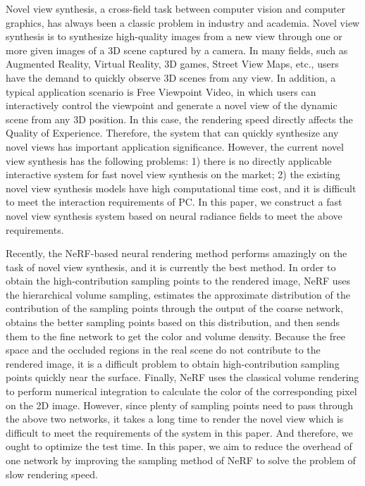 \begin{abstract*}
Novel view synthesis, a cross-field task between computer vision and computer graphics, has always been a classic problem in  industry and academia. Novel view synthesis is to synthesize high-quality images from a new view through one or more given images of a 3D scene captured by a camera. In many fields, such as Augmented Reality, Virtual Reality, 3D games, Street View Maps, etc., users have the demand to quickly observe 3D scenes from any view. In addition, a typical application scenario is Free Viewpoint Video, in which users can interactively control the viewpoint and generate a novel view of the dynamic scene from any 3D position. In this case, the rendering speed directly affects the Quality of Experience. Therefore, the system that can quickly synthesize any novel views has important application significance. However, the current novel view synthesis has the following problems: 1) there is no directly applicable interactive system for fast novel view synthesis on the market; 2) the existing novel view synthesis models have high computational time cost, and it is difficult to meet the interaction requirements of PC. In this paper, we construct a fast novel view synthesis system based on neural radiance fields to meet the above requirements.

Recently, the NeRF-based neural rendering method performs amazingly on the task of novel view synthesis, and it is currently the best method.  
In order to obtain the high-contribution sampling points to the rendered image, NeRF uses the hierarchical volume sampling, estimates the approximate distribution of the contribution of the sampling points through the output of the coarse network, obtains the better sampling points based on this distribution, and then sends them to the fine network to get the color and volume density. 
Because the free space and the occluded regions in the real scene do not contribute to the rendered image, it is a difficult problem to obtain high-contribution sampling points quickly near the surface.
Finally, NeRF uses the classical volume rendering to perform numerical integration to calculate the color of the corresponding pixel on the 2D image. However, since plenty of sampling points need to pass through the above two networks, it takes a long time to render the novel view which is difficult to meet the requirements of the system in this paper. And therefore, we ought to optimize the test time. In this paper, we aim to reduce the overhead of one network by improving the sampling method of NeRF to solve the problem of slow rendering speed.


\end{abstract*}
